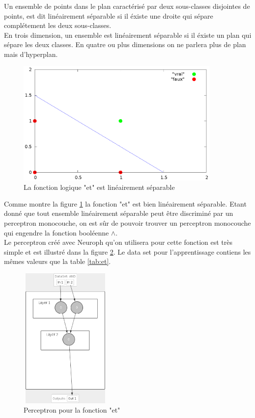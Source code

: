 \documentclass[twoside,openright,a4paper,11pt,french]{article}
\begin{document}
Un ensemble de points dans le plan caractérisé par deux sous-classes disjointes
de points, est dit linéairement séparable si il éxiste une droite qui sépare
complétement les deux sous-classes.\\

En trois dimension, un ensemble est linéairement séparable si il éxiste un plan
qui sépare les deux classes. En quatre ou plus dimensions on ne parlera plus de
plan mais d'hyperplan.


\begin{figure}[h]
\centering
\includegraphics[width=10cm]{./pics/and/and.eps}
\caption{La fonction logique "et" est linéairement séparable}
\label{fig:and}
\end{figure}


Comme montre la figure \ref{fig:and} la fonction "et" est bien linéairement
séparable. Etant donné que tout ensemble linéairement séparable peut être
discriminé par un perceptron monocouche, on est sûr de pouvoir trouver un perceptron monocouche qui
engendre la fonction booléenne $\land$.\\

Le perceptron créé avec Neuroph qu'on utilisera pour cette fonction 
est très simple et est illustré dans la figure \ref{fig:per_and}.
Le data set pour l'apprentissage contiens les mêmes valeurs que la table
\ref{tab:et}.

\begin{figure}[h]
\centering
\includegraphics[width=4.5cm,height=7cm]{./pics/perc_and.eps}
\caption{Perceptron pour la fonction "et"}
\label{fig:per_and}
\end{figure}
\end{document}
